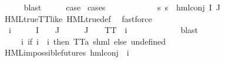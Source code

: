\begin{isabellebody}
\ \ \ \ \isamarkupfalse%
\ blast\isanewline
\ \ \isamarkupfalse%
\ \isamarkupfalse%
\ {\isacharquery}{\kern0pt}case\ \isamarkupfalse%
{\isacharparenleft}{\kern0pt}cases{\isacharparenright}{\kern0pt}\isanewline
\ \ \ \ \isamarkupfalse%
\ {}\isanewline
\ \ \ \ \isamarkupfalse%
\ {\isachardoublequoteopen}{\isasymforall}s{\isachardot}{\kern0pt}\ {\isasymnot}s\ {\isasymTurnstile}\ {\isacharparenleft}{\kern0pt}hml{\isacharunderscore}{\kern0pt}conj\ I\ J\ {\isasymPhi}{\isacharparenright}{\kern0pt}{\isachardoublequoteclose}\ \isanewline
\ \ \ \ \ \ \isamarkupfalse%
\ HML{\isacharunderscore}{\kern0pt}true{\isacharunderscore}{\kern0pt}TT{\isacharunderscore}{\kern0pt}like\ HML{\isacharunderscore}{\kern0pt}true{\isacharunderscore}{\kern0pt}def\ \isamarkupfalse%
\ fastforce\isanewline
\ \ \ \ \isamarkupfalse%
\ {\isasymphi}\ i{\isacharunderscore}{\kern0pt}{\isasymphi}\ \ {\isachardoublequoteopen}{\isasymphi}\ {\isasymin}\ {\isasymPhi}\ {\isacharbackquote}{\kern0pt}\ I\ {\isasyminter}\ {\isasymPhi}\ {\isacharbackquote}{\kern0pt}\ J\ {\isasymor}\ {\isacharparenleft}{\kern0pt}{\isasymphi}\ {\isasymin}\ {\isasymPhi}\ {\isacharbackquote}{\kern0pt}\ J\ {\isasymand}\ {\isasymphi}\ {\isacharequal}{\kern0pt}\ TT{\isacharparenright}{\kern0pt}{\isachardoublequoteclose}\ {\isachardoublequoteopen}{\isasymPhi}\ i{\isacharunderscore}{\kern0pt}{\isasymphi}\ {\isacharequal}{\kern0pt}\ {\isasymphi}{\isachardoublequoteclose}\isanewline
\ \ \ \ \ \ \isamarkupfalse%
\ {}\ \isamarkupfalse%
\ blast\isanewline
\ \ \ \ \isamarkupfalse%
\ {\isasymPsi}\ \ {\isachardoublequoteopen}{\isasymPsi}\ {\isasymequiv}\ {\isacharparenleft}{\kern0pt}{\isasymlambda}i{\isachardot}{\kern0pt}\ {\isacharparenleft}{\kern0pt}if\ i\ {\isacharequal}{\kern0pt}\ i{\isacharunderscore}{\kern0pt}{\isasymphi}\ then\ TT{\isacharcolon}{\kern0pt}{\isacharcolon}{\kern0pt}{\isacharparenleft}{\kern0pt}{\isacharprime}{\kern0pt}a{\isacharcomma}{\kern0pt}\ {\isacharprime}{\kern0pt}s{\isacharparenright}{\kern0pt}hml\ else\ undefined{\isacharparenright}{\kern0pt}{\isacharparenright}{\kern0pt}{\isachardoublequoteclose}\isanewline
\ \ \ \ \isamarkupfalse%
\ {\isachardoublequoteopen}HML{\isacharunderscore}{\kern0pt}impossible{\isacharunderscore}{\kern0pt}futures\ {\isacharparenleft}{\kern0pt}hml{\isacharunderscore}{\kern0pt}conj\ {\isacharbraceleft}{\kern0pt}{\isacharbraceright}{\kern0pt}\ {\isacharbraceleft}{\kern0pt}i{\isacharunderscore}{\kern0pt}{\isasymphi}{\isacharbraceright}{\kern0pt}\ {\isasymPsi}{\isacharparenright}{\kern0pt}{\isachardoublequoteclose}\ \isanewline

\end{isabellebody}
